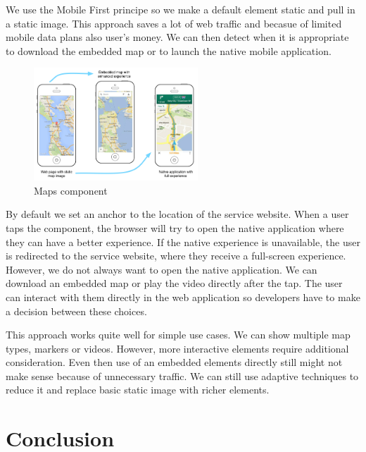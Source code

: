 \documentclass{iitsrc}
\begin{document}
We use the Mobile First principe so we make a default element static and pull in a static image. This approach saves a lot of web traffic and becasue of limited mobile data plans also user's money. We can then detect when it is appropriate to download the embedded map or to launch the native mobile application.

\begin{figure}[ht]
    \begin{center}
        \includegraphics[width=0.55\textwidth]{../images/maps.png}
        \caption{Maps component}
        \label{fig:maps}
    \end{center}
\end{figure}

\noindent By default we set an anchor to the location of the service website. When a user taps the component, the browser will try to open the native application where they can have a better experience. If the native experience is unavailable, the user is redirected to the service website, where they receive a full-screen experience. However, we do not always want to open the native application. We can download an embedded map or play the video directly after the tap. The user can interact with them directly in the web application so developers have to make a decision between these choices.

This approach works quite well for simple use cases. We can show multiple map types, markers or videos. However, more interactive elements require additional consideration. Even then use of an embedded elements directly still might not make sense because of unnecessary traffic. We can still use adaptive techniques to reduce it and replace basic static image with richer elements.




\section{Conclusion} %
\label{sec:conclusion}
\end{document}
